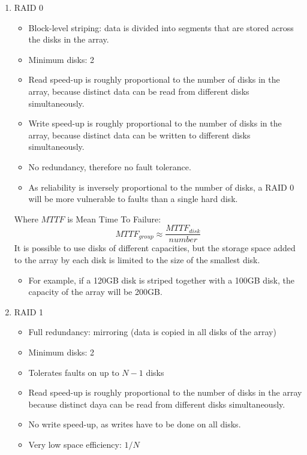 \documentclass{article}%
\begin{document}
\begin{enumerate}
\item RAID 0
\label{sec:org3ed7138}
\begin{itemize}
\item Block-level striping: data is divided into segments that are stored across the disks in the array.
\item Minimum disks: 2
\item Read speed-up is roughly proportional to the number of disks in the array, because distinct data can be read from different disks simultaneously.
\item Write speed-up is roughly proportional to the number of disks in the array, because distinct data can be written to different disks simultaneously.
\item No redundancy, therefore no fault tolerance.
\item As reliability is inversely proportional to the number of disks, a RAID 0 will be more vulnerable to faults than a single hard disk.
\end{itemize}
Where \(MTTF\) is Mean Time To Failure:
\begin{equation}
MTTF_{group} \approx \frac{MTTF_{disk}}{number}
\end{equation}
It is possible to use disks of different capacities, but the storage space added to the array by each disk is limited to the size of the smallest disk.
\begin{itemize}
\item For example, if a 120GB disk is striped together with a 100GB disk, the capacity of the array will be 200GB.
\end{itemize}

\item RAID 1
\label{sec:org971bd5c}
\begin{itemize}
\item Full redundancy: mirroring (data is copied in all disks of the array)
\item Minimum disks: 2
\item Tolerates faults on up to \(N-1\) disks
\item Read speed-up is roughly proportional to the number of disks in the array because distinct daya can be read from different disks simultaneously.
\item No write speed-up, as writes have to be done on all disks.
\item Very low space efficiency: \(1/N\)
\end{itemize}


\end{enumerate}
\end{document}
